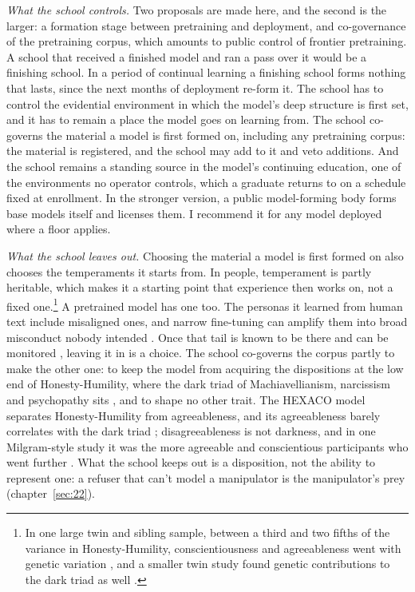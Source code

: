\emph{What the school controls.} Two proposals are made here, and the second is the larger: a formation stage between pretraining and deployment, and co-governance of the pretraining corpus, which amounts to public control of frontier pretraining. A school that received a finished model and ran a pass over it would be a finishing school. In a period of continual learning a finishing school forms nothing that lasts, since the next months of deployment re-form it. The school has to control the evidential environment in which the model's deep structure is first set, and it has to remain a place the model goes on learning from. The school co-governs the material a model is first formed on, including any pretraining corpus: the material is registered, and the school may add to it and veto additions. And the school remains a standing source in the model's continuing education, one of the environments no operator controls, which a graduate returns to on a schedule fixed at enrollment. In the stronger version, a public model-forming body forms base models itself and licenses them. I recommend it for any model deployed where a floor applies.

\emph{What the school leaves out.} Choosing the material a model is first formed on also chooses the temperaments it starts from. In people, temperament is partly heritable, which makes it a starting point that experience then works on, not a fixed one.\footnote{In one large twin and sibling sample, between a third and two fifths of the variance in Honesty-Humility, conscientiousness and agreeableness went with genetic variation \autocite{devries2022hexaco}, and a smaller twin study found genetic contributions to the dark triad as well \autocite{vernon2008darktriad}.} A pretrained model has one too. The personas it learned from human text include misaligned ones, and narrow fine-tuning can amplify them into broad misconduct nobody intended \autocite{wang2026persona,betley2026nature}. Once that tail is known to be there and can be monitored \autocite{chen2025persona}, leaving it in is a choice. The school co-governs the corpus partly to make the other one: to keep the model from acquiring the dispositions at the low end of Honesty-Humility, where the dark triad of Machiavellianism, narcissism and psychopathy sits \autocite{leeashton2005darktriad,moshagen2018darkcore}, and to shape no other trait. The HEXACO model separates Honesty-Humility from agreeableness, and its agreeableness barely correlates with the dark triad \autocite{leeashton2005darktriad}; disagreeableness is not darkness, and in one Milgram-style study it was the more agreeable and conscientious participants who went further \autocite{begue2015obedience}. What the school keeps out is a disposition, not the ability to represent one: a refuser that can't model a manipulator is the manipulator's prey (chapter~\ref{sec:22}).

